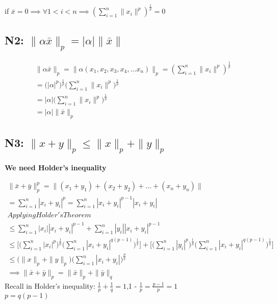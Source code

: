 \documentclass[12pt]{article}
\begin{document}
if $\bar{x} = 0 \implies \forall 1 < i < n \implies (\sum_{i = 1}^{n} \|x_{i}\|^{p})^{\frac{1}{p}} = 0$ \\


\subsection*{N2: $ \| \alpha \bar{x} \|_{p} = | \alpha |  \|\bar{x}\|$} 


\begin{center}
    \begin{eqnarray*}
      \| \alpha \bar{x} \|_{p} =  \| \alpha(x_{1}, x_{2},x_{3}, x_{4},\dots x_{n}) \|_{p} = (\sum_{i = 1}^{n} \|x_{i}\|^{p})^{\frac{1}{p}} \\
      = \biggl(|\alpha|^{p}\biggr)^{\frac{1}{p}} \biggl(\sum_{i = 1}^{n} \|x_{i}\|^{p}\biggr)^{\frac{1}{p}} \\
      = |\alpha| \biggl(\sum_{i = 1}^{n} \|x_{i}\|^{p}\biggr)^{\frac{1}{p}} \\
      = |\alpha|\| \bar{x} \|_{p}
    \end{eqnarray*}
\end{center}


\subsection*{N3: $\| x+ y \|_{p} \leq  \| x \|_{p} + \|y\|_{p} $} 
\textbf{We need Holder's inequality}

\begin{center}
    \begin{eqnarray*}
      \|\bar{x} + \bar{y}\|_{p}^{p} = \|(x_{1}+ y_{1}) + (x_{2}+ y_{2}) + \dots +(x_{n}+ y_{n})\| \\
      = \sum_{i = 1}^{n}|x_{i} + y_{i}|^{p}  = \sum_{i = 1}^{n}|x_{i} + y_{i}|^{p-1} |x_{i} + y_{i}|\\  
      Applying Holder's Theorem \\
      \leq \sum_{i = 1}^{n}|x_{i}||x_{i} + y_{i}|^{p-1} + \sum_{i = 1}^{n}|y_{i}||x_{i} + y_{i}|^{p-1} \\
      \leq \biggl[\big(\sum_{i = 1}^{n}|x_{i}|^{p}\big)^\frac{1}{p}\big(\sum_{i = 1}^{n}|x_{i}+ y_{i}|^{q(p-1)} \big)^{\frac{1}{q}}\biggr] +  \biggl[\big(\sum_{i = 1}^{n}|y_{i}|^{p}\big)^\frac{1}{p}\big(\sum_{i = 1}^{n}|x_{i}+ y_{i}|^{q(p-1)} \big)^{\frac{1}{q}}\biggr] \\
      \leq \Biggl(\|x\|_{p} + \|y\|_{p}\Biggr)\Biggl(\sum_{i = 1}^{n}|x_{i}+ y_{i}| \Biggr)^{\frac{p}{q}} \\
      \implies \|\bar{x} + \bar{y}\|_{p} = \|\bar{x}\|_{p} + \|\bar{y}\|_{q}
    \end{eqnarray*}
Recall in Holder's inequality: $\frac{1}{p} + \frac{1}{q} = 1$,1 - $\frac{1}{p} =  \frac{p-1}{p} = 1$ \\

$p = q(p-1)$
\end{center}
\end{document}
